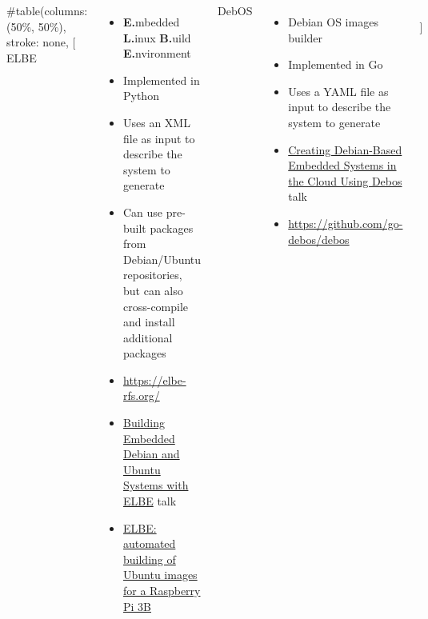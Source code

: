 \begin{columns}
#table(columns: (50\%, 50\%), stroke: none,
[
    ELBE
    \begin{itemize}
    \item {\bf E.}mbedded {\bf L.}inux {\bf B.}uild {\bf E.}nvironment
    \item Implemented in Python
    \item Uses an XML file as input to describe the system to generate
    \item Can use pre-built packages from Debian/Ubuntu repositories,
      but can also cross-compile and install additional packages
    \item \url{https://elbe-rfs.org/}
    \item \href{https://www.youtube.com/watch?v=BwHzyCGB7As}{Building
        Embedded Debian and Ubuntu Systems with ELBE} talk
    \item
      \href{https://bootlin.com/blog/elbe-automated-building-of-ubuntu-images-for-a-raspberry-pi-3b/}{ELBE:
        automated building of Ubuntu images for a Raspberry Pi 3B}
    \end{itemize}
    DebOS
    \begin{itemize}
    \item Debian OS images builder
    \item Implemented in Go
    \item Uses a YAML file as input to describe the system to generate
    \item \href{https://www.youtube.com/watch?v=_NZrSR3prwk}{Creating
        Debian-Based Embedded Systems in the Cloud Using Debos} talk
    \item \url{https://github.com/go-debos/debos}
    \end{itemize}
  \\]



\end{columns}
